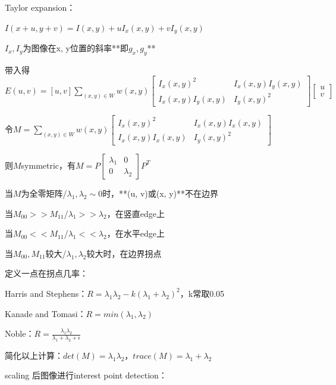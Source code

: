 \documentclass[UTF8]{ctexart}
\begin{document}
  \quad Taylor expansion：

  \quad \quad $I(x + u, y + v) = I(x, y) + uI_x(x, y) + vI_y(x, y)$

  \quad \quad \quad $I_x, I_y$为图像在x, y位置的斜率**即$g_x, g_y$**

  \quad \quad 带入得$E(u, v) = [u, v]\sum_{(x, y) \in W}w(x, y)
    \begin{bmatrix}
      I_x(x, y)^2 & I_x(x, y)I_y(x, y) \\
      I_x(x, y)I_y(x, y) & I_y(x, y)^2
      \end{bmatrix}
    \begin{bmatrix}
      u \\ 
      v
      \end{bmatrix}$

  \quad \quad 令$M = \sum_{(x, y) \in W}w(x, y)
    \begin{bmatrix}
      I_x(x, y)^2 & I_x(x, y)I_x(x, y) \\
      I_x(x, y)I_x(x, y) & I_y(x, y)^2
      \end{bmatrix}$

  \quad \quad 则$M$symmetric，有$M = P 
    \begin{bmatrix}
      \lambda_1 & 0 \\
      0 & \lambda_2
      \end{bmatrix} P^T$

  \quad \quad \quad 当$M$为全零矩阵/$\lambda_1,\lambda_2 \sim 0$时，**(u, v)或(x, y)**不在边界

  \quad \quad \quad 当$M_{00} >> M_{11}$/$\lambda_1 >> \lambda_2$，在竖直edge上

  \quad \quad \quad 当$M_{00} << M_{11}$/$\lambda_1 << \lambda_2$，在水平edge上

  \quad \quad \quad 当$M_{00}, M_{11}$较大/$\lambda_1, \lambda_2$较大时，在边界拐点

  \quad 定义一点在拐点几率：

  \quad \quad Harris and Stephens：$R = \lambda_1\lambda_2 - k(\lambda_1 + \lambda_2)^2$，k常取0.05

  \quad \quad Kanade and Tomasi：$R = min(\lambda_1, \lambda_2)$

  \quad \quad Noble：$R = \frac{\lambda_1\lambda_2}{\lambda_1 + \lambda_2 + \epsilon}$

  \quad \quad 简化以上计算：$det(M) = \lambda_1\lambda_2$，$trace(M) = \lambda_1 + \lambda_2$

  scaling 后图像进行interest point detection：
\end{document}
